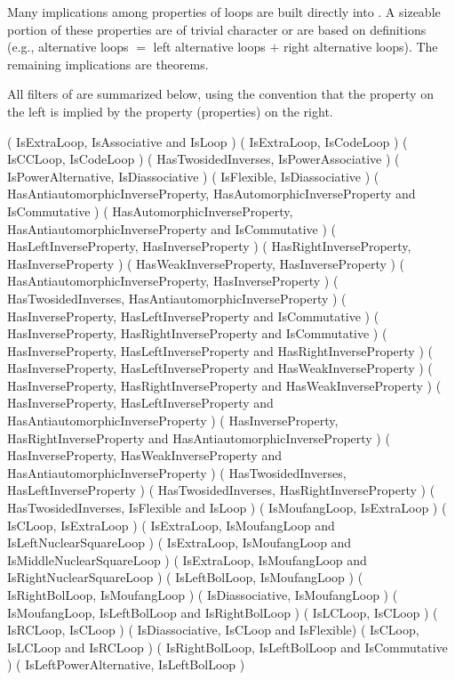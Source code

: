 
Many implications among properties of loops are built directly into {\LOOPS}. A
sizeable portion of these properties are of trivial character or are based on
definitions (e.g., alternative loops $=$ left alternative loops $+$ right
alternative loops). The remaining implications are theorems.

All filters of {\LOOPS} are summarized below, using the {\GAP} convention that
the property on the left is implied by the property (properties) on the right.

\begintt
( IsExtraLoop, IsAssociative and IsLoop )
( IsExtraLoop, IsCodeLoop )
( IsCCLoop, IsCodeLoop )
( HasTwosidedInverses, IsPowerAssociative )
( IsPowerAlternative, IsDiassociative )
( IsFlexible, IsDiassociative )
( HasAntiautomorphicInverseProperty, HasAutomorphicInverseProperty and IsCommutative )
( HasAutomorphicInverseProperty, HasAntiautomorphicInverseProperty and IsCommutative )
( HasLeftInverseProperty, HasInverseProperty )
( HasRightInverseProperty, HasInverseProperty )
( HasWeakInverseProperty, HasInverseProperty )
( HasAntiautomorphicInverseProperty, HasInverseProperty )
( HasTwosidedInverses, HasAntiautomorphicInverseProperty )
( HasInverseProperty, HasLeftInverseProperty and IsCommutative )
( HasInverseProperty, HasRightInverseProperty and IsCommutative )
( HasInverseProperty, HasLeftInverseProperty and HasRightInverseProperty )
( HasInverseProperty, HasLeftInverseProperty and HasWeakInverseProperty )
( HasInverseProperty, HasRightInverseProperty and HasWeakInverseProperty )
( HasInverseProperty, HasLeftInverseProperty and HasAntiautomorphicInverseProperty )
( HasInverseProperty, HasRightInverseProperty and HasAntiautomorphicInverseProperty )
( HasInverseProperty, HasWeakInverseProperty and HasAntiautomorphicInverseProperty )
( HasTwosidedInverses, HasLeftInverseProperty )
( HasTwosidedInverses, HasRightInverseProperty )
( HasTwosidedInverses, IsFlexible and IsLoop )
( IsMoufangLoop, IsExtraLoop )
( IsCLoop, IsExtraLoop )
( IsExtraLoop, IsMoufangLoop and IsLeftNuclearSquareLoop )
( IsExtraLoop, IsMoufangLoop and IsMiddleNuclearSquareLoop )
( IsExtraLoop, IsMoufangLoop and IsRightNuclearSquareLoop )
( IsLeftBolLoop, IsMoufangLoop )
( IsRightBolLoop, IsMoufangLoop )
( IsDiassociative, IsMoufangLoop )
( IsMoufangLoop, IsLeftBolLoop and IsRightBolLoop )
( IsLCLoop, IsCLoop )
( IsRCLoop, IsCLoop )
( IsDiassociative, IsCLoop and IsFlexible)
( IsCLoop, IsLCLoop and IsRCLoop )
( IsRightBolLoop, IsLeftBolLoop and IsCommutative )
( IsLeftPowerAlternative, IsLeftBolLoop )
